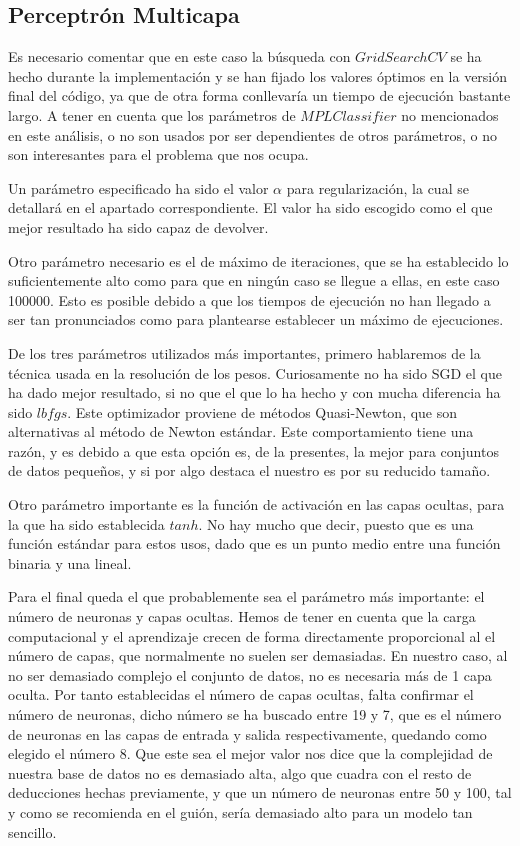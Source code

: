 \documentclass{article}
\begin{document}
	\subsection{Perceptrón Multicapa}
	Es necesario comentar que en este caso la búsqueda con $GridSearchCV$ se ha hecho durante la implementación y se han fijado los valores óptimos en la versión final del código, ya que de otra forma conllevaría un tiempo de ejecución bastante largo. A tener en cuenta que los parámetros de $MPLClassifier$ no mencionados en este análisis, o no son usados por ser dependientes de otros parámetros, o no son interesantes para el problema que nos ocupa.
	\par
	Un parámetro especificado ha sido el valor $\alpha$ para regularización, la cual se detallará en el apartado correspondiente. El valor ha sido escogido como el que mejor resultado ha sido capaz de devolver.
	\par
	Otro parámetro necesario es el de máximo de iteraciones, que se ha establecido lo suficientemente alto como para que en ningún caso se llegue a ellas, en este caso 100000. Esto es posible debido a que los tiempos de ejecución no han llegado a ser tan pronunciados como para plantearse establecer un máximo de ejecuciones.
	\par
	De los tres parámetros utilizados más importantes, primero hablaremos de la técnica usada en la resolución de los pesos. Curiosamente no ha sido SGD el que ha dado mejor resultado, si no que el que lo ha hecho y con mucha diferencia ha sido $lbfgs$. Este optimizador proviene de métodos Quasi-Newton, que son alternativas al método de Newton estándar. Este comportamiento tiene una razón, y es debido a que esta opción es, de la presentes, la mejor para conjuntos de datos pequeños, y si por algo destaca el nuestro es por su reducido tamaño.
	\par
	Otro parámetro importante es la función de activación en las capas ocultas, para la que ha sido establecida $tanh$. No hay mucho que decir, puesto que es una función estándar para estos usos, dado que es un punto medio entre una función binaria y una lineal.
	\par
	Para el final queda el que probablemente sea el parámetro más importante: el número de neuronas y capas ocultas. Hemos de tener en cuenta que la carga computacional y el aprendizaje crecen de forma directamente proporcional al el número de capas, que normalmente no suelen ser demasiadas. En nuestro caso, al no ser demasiado complejo el conjunto de datos, no es necesaria más de 1 capa oculta. Por tanto establecidas el número de capas ocultas, falta confirmar el número de neuronas, dicho número se ha buscado entre 19 y 7, que es el número de neuronas en las capas de entrada y salida respectivamente, quedando como elegido el número 8. Que este sea el mejor valor nos dice que la complejidad de nuestra base de datos no es demasiado alta, algo que cuadra con el resto de deducciones hechas previamente, y que un número de neuronas entre 50 y 100, tal y como se recomienda en el guión, sería demasiado alto para un modelo tan sencillo.
\end{document}
